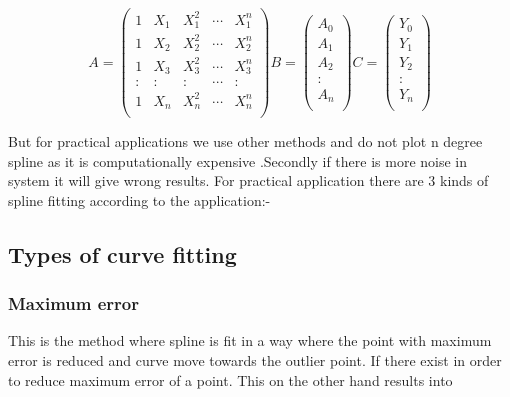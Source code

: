 \begin{equation}
A = 
\begin{pmatrix}
  1 & X_{1} & X_{1}^{2} & \cdots & X_{1}^{n} \\
  1 & X_{2} & X_{2}^{2} & \cdots & X_{2}^{n} \\
  1 & X_{3} & X_{3}^{2} & \cdots & X_{3}^{n} \\
  : & :     &     :     & \cdots &    :      \\
  1 & X_{n} & X_{n}^{2} & \cdots & X_{n}^{n} \\
 \end{pmatrix}
B = 
\begin{pmatrix}
  A_{0} \\
  A_{1} \\
  A_{2} \\
  : 	\\
  A_{n} \\
 \end{pmatrix}
 C = 
\begin{pmatrix}
  Y_{0} \\
  Y_{1} \\
  Y_{2} \\
  : 	\\
  Y_{n} \\
 \end{pmatrix}
\end{equation}

But for practical applications we use other methods and do not plot n degree spline as it is computationally expensive .Secondly if there is more noise in system it will give wrong results. 
For practical application there are 3 kinds of spline fitting according to the application:-

\subsection{Types of curve fitting}
\subsubsection{Maximum error}
This is the method where spline is fit in a way where the point with maximum error is reduced and curve move towards the outlier point. If there exist in order to reduce maximum error of a point. This on the other hand results into

